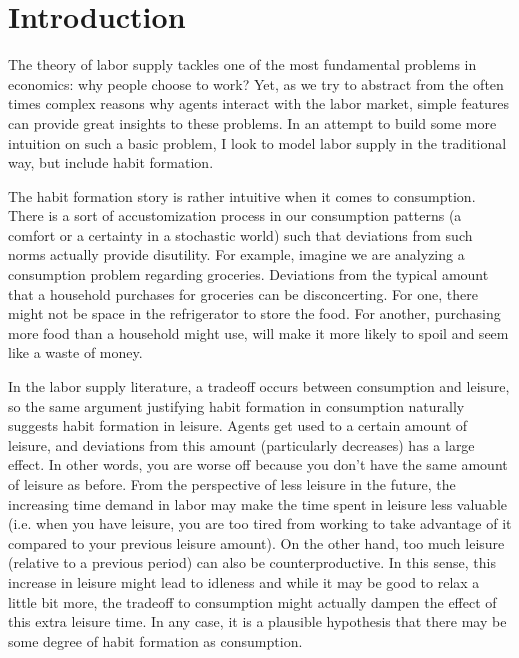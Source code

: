 \documentclass[ProjectMMD]{subfiles}
\begin{document}
{\titlepagefinish}

\hypertarget{Introduction}{}
\section{Introduction}\label{sec:intro}

The theory of labor supply tackles one of the most fundamental problems in economics: why people choose to work? Yet, as we try to abstract from the often times complex reasons why agents interact with the labor market, simple features can provide great insights to these problems. In an attempt to build some more intuition on such a basic problem, I look to model labor supply in the traditional way, but include habit formation.

The habit formation story is rather intuitive when it comes to consumption. There is a sort of accustomization process in our consumption patterns (a comfort or a certainty in a stochastic world) such that deviations from such norms actually provide disutility. For example, imagine we are analyzing a consumption problem regarding groceries. Deviations from the typical amount that a household purchases for groceries can be disconcerting. For one, there might not be space in the refrigerator to store the food. For another, purchasing more food than a household might use, will make it more likely to spoil and seem like a waste of money. 

In the labor supply literature, a tradeoff occurs between consumption and leisure, so the same argument justifying habit formation in consumption naturally suggests habit formation in leisure. Agents get used to a certain amount of leisure, and deviations from this amount (particularly decreases) has a large effect. In other words, you are worse off because you don't have the same amount of leisure as before. From the perspective of less leisure in the future, the increasing time demand in labor may make the time spent in leisure less valuable (i.e. when you have leisure, you are too tired from working to take advantage of it compared to your previous leisure amount). On the other hand, too much leisure (relative to a previous period) can also be counterproductive. In this sense, this increase in leisure might lead to idleness and while it may be good to relax a little bit more, the tradeoff to consumption might actually dampen the effect of this extra leisure time. In any case, it is a plausible hypothesis that there may be some degree of habit formation as consumption.
\end{document}
